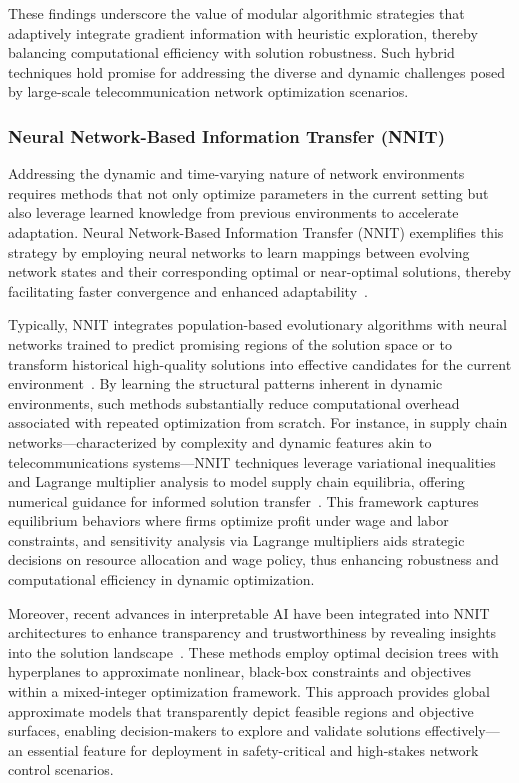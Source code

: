 \documentclass[sigconf]{acmart}
\begin{document}
These findings underscore the value of modular algorithmic strategies that adaptively integrate gradient information with heuristic exploration, thereby balancing computational efficiency with solution robustness. Such hybrid techniques hold promise for addressing the diverse and dynamic challenges posed by large-scale telecommunication network optimization scenarios.

\subsubsection{Neural Network-Based Information Transfer (NNIT)}

Addressing the dynamic and time-varying nature of network environments requires methods that not only optimize parameters in the current setting but also leverage learned knowledge from previous environments to accelerate adaptation. Neural Network-Based Information Transfer (NNIT) exemplifies this strategy by employing neural networks to learn mappings between evolving network states and their corresponding optimal or near-optimal solutions, thereby facilitating faster convergence and enhanced adaptability~\cite{ref38,ref39,ref40,ref47}.

Typically, NNIT integrates population-based evolutionary algorithms with neural networks trained to predict promising regions of the solution space or to transform historical high-quality solutions into effective candidates for the current environment~\cite{ref47}. By learning the structural patterns inherent in dynamic environments, such methods substantially reduce computational overhead associated with repeated optimization from scratch. For instance, in supply chain networks—characterized by complexity and dynamic features akin to telecommunications systems—NNIT techniques leverage variational inequalities and Lagrange multiplier analysis to model supply chain equilibria, offering numerical guidance for informed solution transfer~\cite{ref38}. This framework captures equilibrium behaviors where firms optimize profit under wage and labor constraints, and sensitivity analysis via Lagrange multipliers aids strategic decisions on resource allocation and wage policy, thus enhancing robustness and computational efficiency in dynamic optimization.

Moreover, recent advances in interpretable AI have been integrated into NNIT architectures to enhance transparency and trustworthiness by revealing insights into the solution landscape~\cite{ref39}. These methods employ optimal decision trees with hyperplanes to approximate nonlinear, black-box constraints and objectives within a mixed-integer optimization framework. This approach provides global approximate models that transparently depict feasible regions and objective surfaces, enabling decision-makers to explore and validate solutions effectively—an essential feature for deployment in safety-critical and high-stakes network control scenarios.
\end{document}
